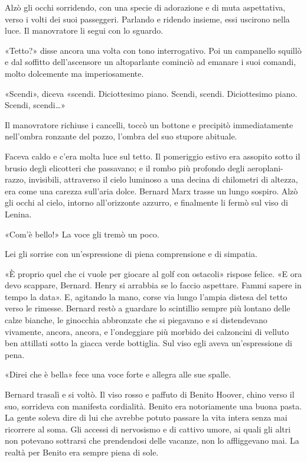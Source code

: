 \documentclass[
a5paper, %
10pt, %
twoside, 
onecolumn, %
openany, %
]{memoir}
\begin{document}
Alzò gli occhi sorridendo, con una specie di adorazione e di muta aspettativa, verso i volti dei suoi passeggeri. Parlando e ridendo insieme, essi uscirono nella luce. Il manovratore li segui con lo sguardo.

«Tetto?» disse ancora una volta con tono interrogativo. Poi un campanello squillò e dal soffitto dell’ascensore un altoparlante cominciò ad emanare i suoi comandi, molto dolcemente ma imperiosamente.

«Scendi», diceva «scendi. Diciottesimo piano. Scendi, scendi. Diciottesimo piano. Scendi, scendi…»

Il manovratore richiuse i cancelli, toccò un bottone e precipitò immediatamente nell’ombra ronzante del pozzo, l’ombra del suo stupore abituale.

Faceva caldo e c’era molta luce sul tetto. Il pomeriggio estivo era assopito sotto il brusio degli elicotteri che passavano; e il rombo più profondo degli aeroplani-razzo, invisibili, attraverso il cielo luminoso a una decina di chilometri di altezza, era come una carezza sull’aria dolce. Bernard Marx trasse un lungo sospiro. Alzò gli occhi al cielo, intorno all’orizzonte azzurro, e finalmente li fermò sul viso di Lenina.

«Com’è bello!» La voce gli tremò un poco.

Lei gli sorrise con un’espressione di piena comprensione e di simpatia.

«È proprio quel che ci vuole per giocare al golf con ostacoli» rispose felice. «E ora devo scappare, Bernard. Henry si arrabbia se lo faccio aspettare. Fammi sapere in tempo la data». E, agitando la mano, corse via lungo l’ampia distesa del tetto verso le rimesse. Bernard restò a guardare lo scintillio sempre più lontano delle calze bianche, le ginocchia abbronzate che si piegavano e si distendevano vivamente, ancora, ancora, e l’ondeggiare più morbido dei calzoncini di velluto ben attillati sotto la giacca verde bottiglia. Sul viso egli aveva un’espressione di pena.

«Direi che è bella» fece una voce forte e allegra alle sue spalle.

Bernard trasalì e si voltò. Il viso rosso e paffuto di Benito Hoover, chino verso il suo, sorrideva con manifesta cordialità. Benito era notoriamente una buona pasta. La gente soleva dire di lui che avrebbe potuto passare la vita intera senza mai ricorrere al soma. Gli accessi di nervosismo e di cattivo umore, ai quali gli altri non potevano sottrarsi che prendendosi delle vacanze, non lo affliggevano mai. La realtà per Benito era sempre piena di sole.
\end{document}
